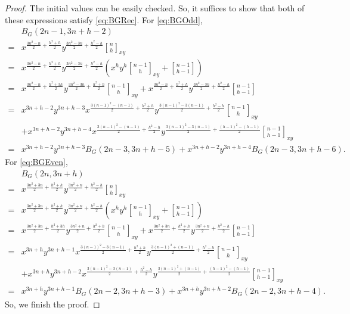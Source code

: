 \documentclass[12pt]{amsart}
\theoremstyle{definition}
\theoremstyle{remark}
\numberwithin{equation}{section}
\begin{document}
\begin{proof}
The initial values can be easily checked. So, it suffices to show that both of these expressions satisfy \eqref{eq:BGRec}. For \eqref{eq:BGOdd},
\begin{align*}
&B_G(2n-1,3n+h-2)\\
=&x^{\frac{3n^2-n}{2}+\frac{h^2+h}{2}}y^{\frac{3n^2-3n}{2}+\frac{h^2-h}{2}}{n\brack h}_{xy}\\
=&x^{\frac{3n^2-n}{2}+\frac{h^2+h}{2}}y^{\frac{3n^2-3n}{2}+\frac{h^2-h}{2}}\left(x^hy^{h}{n-1\brack h}_{xy}+{n-1 \brack h-1}\right)\\
=&x^{\frac{3n^2-n}{2}+\frac{h^2+3h}{2}}y^{\frac{3n^2-3n}{2}+\frac{h^2+h}{2}}{n-1\brack h}_{xy}+x^{\frac{3n^2-n}{2}+\frac{h^2+h}{2}}y^{\frac{3n^2-3n}{2}+\frac{h^2-h}{2}}{n-1 \brack h-1}\\
=&x^{3n+h-2}y^{3n+h-3}x^{\frac{3(n-1)^2-(n-1)}{2}+\frac{h^2+h}{2}}y^{\frac{3(n-1)^2-3(n-1)}{2}+\frac{h^2-h}{2}}{n-1\brack h}_{xy}\\
&+x^{3n+h-2}y^{3n+h-4}x^{\frac{3(n-1)^2-(n-1)}{2}+\frac{h^2-h}{2}}y^{\frac{3(n-1)^2-3(n-1)}{2}+\frac{(h-1)^2-(h-1)}{2}}{n-1\brack h-1}_{xy}\\
=&x^{3n+h-2}y^{3n+h-3}B_{G}(2n-3,3n+h-5)+x^{3n+h-2}y^{3n+h-4}B_{G}(2n-3,3n+h-6).
\end{align*}
For \eqref{eq:BGEven},
\begin{align*}
&B_G(2n,3n+h)\\
=&x^{\frac{3n^2+3n}{2}+\frac{h^2+h}{2}}y^{\frac{3n^2+n}{2}+\frac{h^2-h}{2}}{n\brack h}_{xy}\\
=&x^{\frac{3n^2+3n}{2}+\frac{h^2+h}{2}}y^{\frac{3n^2+n}{2}+\frac{h^2-h}{2}}\left(x^hy^{h}{n-1\brack h}_{xy}+{n-1 \brack h-1}\right)\\
=&x^{\frac{3n^2+3n}{2}+\frac{h^2+3h}{2}}y^{\frac{3n^2+n}{2}+\frac{h^2+h}{2}}{n-1\brack h}_{xy}+x^{\frac{3n^2+3n}{2}+\frac{h^2+h}{2}}y^{\frac{3n^2+n}{2}+\frac{h^2-h}{2}}{n-1 \brack h-1}\\
=&x^{3n+h}y^{3n+h-1}x^{\frac{3(n-1)^2-3(n-1)}{2}+\frac{h^2+h}{2}}y^{\frac{3(n-1)^2+(n-1)}{2}+\frac{h^2-h}{2}}{n-1\brack h}_{xy}\\
&+x^{3n+h}y^{3n+h-2}x^{\frac{3(n-1)^2-3(n-1)}{2}+\frac{h^2-h}{2}}y^{\frac{3(n-1)^2+(n-1)}{2}+\frac{(h-1)^2-(h-1)}{2}}{n-1\brack h-1}_{xy}\\
=&x^{3n+h}y^{3n+h-1}B_{G}(2n-2,3n+h-3)+x^{3n+h}y^{3n+h-2}B_{G}(2n-2,3n+h-4).
\end{align*}
So, we finish the proof.
\end{proof}
\end{document}
